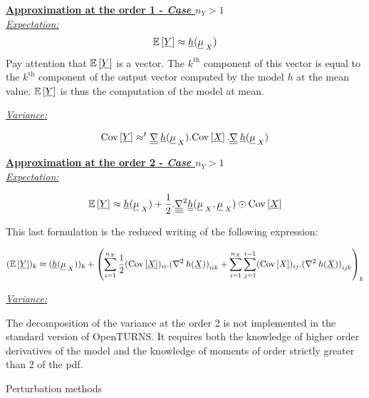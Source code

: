 {  \underline{\textbf{Approximation at the order 1 - \textit{Case $n_Y > 1$}}}\\

  \underline{\textit{Expectation:}}
  \begin{align*}
    {\mathbb E}\left[ \underline{Y} \right] \approx \underline{h}(\underline{\mu}_{\:X})
  \end{align*}
  Pay attention that ${\mathbb E}\left[ \underline{Y} \right]$ is a vector. The $k^\textrm{th}$ component of this vector is equal to the $k^\textrm{th}$ component of the output vector computed by the model $h$ at the mean value. ${\mathbb E}\left[ \underline{Y} \right]$ is thus the computation of the model at mean.

  \underline{\textit{Variance:}}

  \begin{align*}
    {\rm Cov}\left[ \underline{Y} \right] \approx ^t\underline{\underline{\nabla}}\:\underline{h}(\underline{\mu}_{\:X}).{\rm Cov}\left[ \underline{X} \right].\underline{\underline{\nabla}}\:\underline{h}(\underline{\mu}_{\:X})
  \end{align*}

  \underline{\textbf{Approximation at the order 2 - \textit{Case $n_Y > 1$}}}\\

  \underline{\textit{Expectation:}}

  \begin{align*}
    {\mathbb E}\left[ \underline{Y} \right] \approx \underline{h}(\underline{\mu}_{\:X}) + \frac{1}{2}.\underline{\underline{\underline{\nabla}}}^2 \underline{\underline{h}}(\underline{\mu}_{\:X},\underline{\mu}_{\:X}) \odot {\rm Cov}\left[ \underline{X} \right]
  \end{align*}

  This last formulation is the reduced writing of the following expression:

  \begin{align*}
    ({\mathbb E}\left[ \underline{Y} \right])_k \approx (\underline{h}(\underline{\mu}_{\:X}))_k + \left( \sum_{i=1}^{n_X}\frac{1}{2} ({\rm Cov}\left[ \underline{X} \right])_{ii}.{(\nabla^2\:h(\underline{X}))}_{iik} + \sum_{i=1}^{n_X} \sum_{j=1}^{i-1} ({\rm Cov}\left[ X \right])_{ij}.{(\nabla^2\:h(\underline{X}))}_{ijk}  \right)_k
  \end{align*}

  \underline{\textit{Variance:}}

  The decomposition of the variance at the order 2 is not implemented in the standard version of OpenTURNS. It requires both the knowledge of higher order derivatives of the model and the knowledge of moments of order strictly greater than 2 of the pdf.

}
{
  Perturbation methods
}


